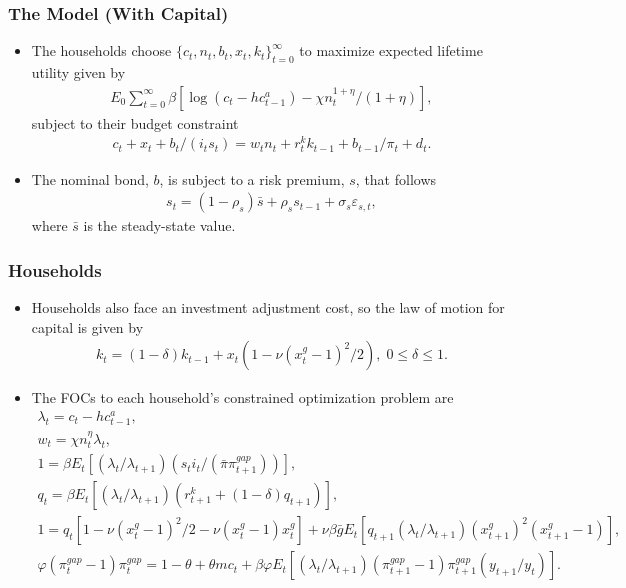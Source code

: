 \documentclass[11pt]{beamer}
\begin{document}
\begin{frame}\frametitle{The Model (With Capital)}
\begin{itemize}\setlength{\itemsep}{6pt}
\item <1-|handout:1>The households choose $\{c_t, n_t, b_t, x_t, k_t\}_{t=0}^\infty$ to maximize expected lifetime utility given by
\begin{gather*}
E_0\sum_{t=0}^\infty\beta[\log(c_t-hc^a_{t-1}) - \chi n_t^{1+\eta}/(1+\eta)],
\end{gather*} 
subject to their budget constraint
\begin{gather*}
    c_t+x_t+b_t/(i_ts_t)=w_tn_t+r_t^kk_{t-1}+b_{t-1}/\pi_t+d_t.
  \end{gather*} 
\item <2-|handout:1>The nominal bond, $b$, is subject to a risk premium, $s$, that follows
\begin{gather*}
  s_t = (1-\rho_s)\bar{s} + \rho_ss_{t-1} + \sigma_s\varepsilon_{s,t},
\end{gather*}
where $\bar{s}$ is the steady-state value. %
\end{itemize}
\end{frame}
\begin{frame}\frametitle{Households}
\begin{itemize}\setlength{\itemsep}{8pt}
\item <1-|handout:1>Households also face an investment adjustment cost, so the law of motion for capital is given by
\begin{gather*}
  k_t = (1-\delta)k_{t-1} + x_t(1-\nu(x^g_t - 1)^2/2),\; 0 \leq \delta \leq 1.
  \end{gather*} %
\item <2-|handout:1>The FOCs to each household's constrained optimization problem are
\scriptsize
\begin{gather*}
  \lambda_t = c_t - hc^a_{t-1}, \\
  w_t = \chi n_t^\eta \lambda_t,\\
  1 =  \beta E_t[(\lambda_t/\lambda_{t+1})(s_ti_t/(\bar{\pi}\pi_{t+1}^{gap}))],\\
  q_t = \beta E_t[(\lambda_t/\lambda_{t+1})(r^k_{t+1}+(1-\delta)q_{t+1})],\\
  1 = q_t[1-\nu(x^g_t-1)^2/2 - \nu(x_t^g-1)x_t^g] + \nu\beta\bar{g}E_t[q_{t+1}(\lambda_t/\lambda_{t+1})(x^g_{t+1})^2(x^g_{t+1}-1)],\\
  \varphi(\pi_t^{gap}-1)\pi_t^{gap} = 1-\theta + \theta mc_t + \beta\varphi E_t[(\lambda_t/\lambda_{t+1})(\pi_{t+1}^{gap}-1)\pi_{t+1}^{gap}(y_{t+1}/y_t)].
\end{gather*} %
\normalsize
\end{itemize}
\end{frame}
\end{document}
